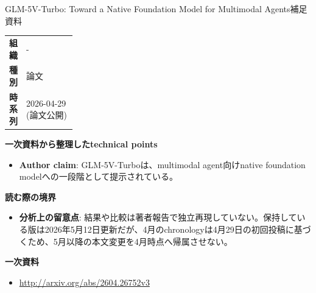 \begin{technicalnote}{GLM-5V-Turbo: Toward a Native Foundation Model for Multimodal Agents}{補足資料}
\begingroup
\begin{tabularx}{\linewidth}{@{}>{\bfseries}p{0.22\linewidth}X@{}}
組織 & - \\
種別 & 論文 \\
時系列 & 2026-04-29 (論文公開) \\
\end{tabularx}
\smallskip
{\bfseries 一次資料から整理したtechnical points}
\begin{itemize}[leftmargin=1.5em,itemsep=0.35em]
\item \textbf{Author claim}: GLM-5V-Turboは、multimodal agent向けnative foundation modelへの一段階として提示されている。
\end{itemize}
{\bfseries 読む際の境界}
\begin{itemize}[leftmargin=1.5em,itemsep=0.35em]
\item \textbf{分析上の留意点}: 結果や比較は著者報告で独立再現していない。保持している版は2026年5月12日更新だが、4月のchronologyは4月29日の初回投稿に基づくため、5月以降の本文変更を4月時点へ帰属させない。
\end{itemize}
\begin{samepage}
{\bfseries 一次資料}
\begingroup\sloppy
\begin{itemize}[leftmargin=1.5em,itemsep=0.25em]
\item {\scriptsize\url{http://arxiv.org/abs/2604.26752v3}}
\end{itemize}
\endgroup
\end{samepage}
\endgroup
\end{technicalnote}
\medskip

